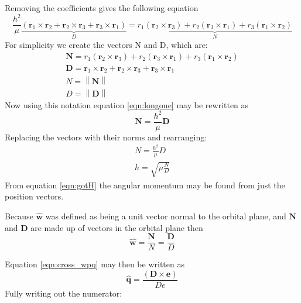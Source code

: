 \documentclass[12pt]{article}
\newcommand{\norm}[1]{\left\lVert#1\right\rVert}
\begin{document}
	 Removing the coefficients gives the following equation
	 \begin{equation}
	 \frac { h ^ { 2 } } { \mu } \underbrace{\left( \mathbf { r } _ { 1 } \times \mathbf { r } _ { 2 } + \mathbf { r } _ { 2 } \times \mathbf { r } _ { 3 } + \mathbf { r } _ { 3 } \times \mathbf { r } _ { 1 } \right)}_{D} = \underbrace{r _ { 1 } \left( \mathbf { r } _ { 2 } \times \mathbf { r } _ { 3 } \right) + r _ { 2 } \left( \mathbf { r } _ { 3 } \times \mathbf { r } _ { 1 } \right) + r _ { 3 } \left( \mathbf { r } _ { 1 } \times \mathbf { r } _ { 2 } \right)}_{N}
	 \label{eqn:longone}
	 \end{equation}
	 For simplicity we create the vectors N and D, which are: 
	 \begin{eqnarray}
	 	 \mathbf { N } = r _ { 1 } \left( \mathbf { r } _ { 2 } \times \mathbf { r } _ { 3 } \right) + r _ { 2 } \left( \mathbf { r } _ { 3 } \times \mathbf { r } _ { 1 } \right) + r _ { 3 } \left( \mathbf { r } _ { 1 } \times \mathbf { r } _ { 2 } \right)\\
	 	 \mathbf { D } = \mathbf { r } _ { 1 } \times \mathbf { r } _ { 2 } + \mathbf { r } _ { 2 } \times \mathbf { r } _ { 3 } + \mathbf { r } _ { 3 } \times \mathbf { r } _ { 1 }\\
	 	 N=\norm{\mathbf{N}}\\
	 	 D=\norm{\mathbf{D}}
	 \end{eqnarray}
 	Now using this notation equation \ref{eqn:longone} may be rewritten as 
	\begin{equation}
	\mathbf { N } = \frac { h ^ { 2 } } { \mu } \mathbf { D }
	\end{equation}
	Replacing the vectors with their norms and rearranging:
	\begin{eqnarray}
	N = \frac { h ^ { 2 } } { \mu } D\\
	h = \sqrt { \mu \frac { N } { D } }
	\label{eqn:gotH}
	\end{eqnarray}
	From equation \ref{eqn:gotH} the angular momentum may be found from just the position vectors.
	
	Because $\hat{ \mathbf { w } }$ was defined as being a unit vector normal to the orbital plane, and $\mathbf{ N }$ and $\mathbf{ D }$ are made up of vectors in the orbital plane then
	\begin{equation}
	\hat{ \mathbf { w } }=\frac{\mathbf{ N }}{N}=\frac{\mathbf{ D }}{D}
	\end{equation}
	
	Equation \ref{eqn:cross_wpq} may then be written as
	\begin{equation}
	\hat { \mathbf { q } } = \frac { ( \mathbf { D } \times \mathbf { e } ) } { D e }
	\label{eqn:p1}
	\end{equation}
	Fully writing out the numerator:
	
\end{document}
